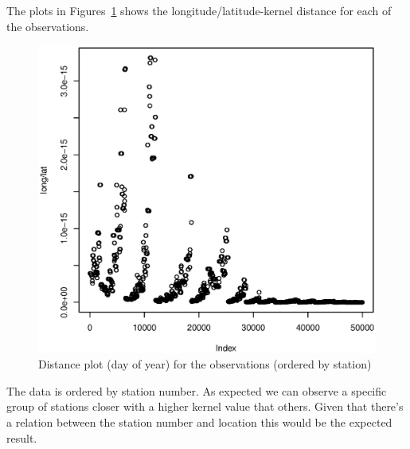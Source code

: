 \documentclass[a4paper, twocolumn]{article}
\begin{document}
    The plots in Figures~\ref{fig:dist} shows the longitude/latitude-kernel distance for each of the observations.  
    \begin{figure}[H]
    \centering
    \caption{Distance plot (day of year) for the observations (ordered by station)\label{fig:dist}}
	    \begin{minipage}[]{0.4\textwidth}
	    	\includegraphics[width=\textwidth]{share/1_dist.eps}
	    \end{minipage}
    \end{figure}
    The data is ordered by station number. As expected we can observe a specific group of stations closer with a higher kernel value that others. Given that there's a relation between the station number and location this would be the expected result.
\end{document}
